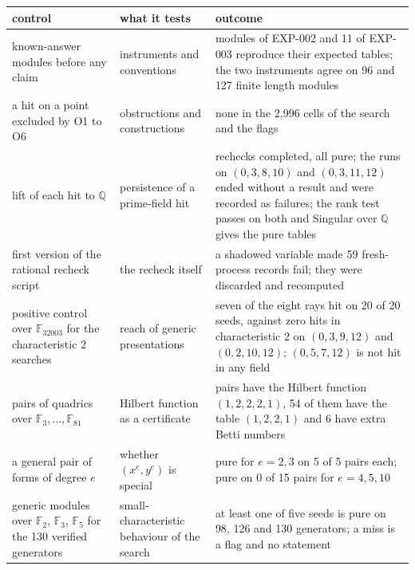 \begin{tabular}{@{}>{\raggedright\arraybackslash}p{4.3cm}>{\raggedright\arraybackslash}p{3.1cm}>{\raggedright\arraybackslash}p{6.1cm}@{}}
\toprule
control & what it tests & outcome\\
\midrule
known-answer modules before any claim & instruments and conventions & 17 modules of EXP-002 and 11 of EXP-003 reproduce their expected tables; the two instruments agree on 96 and 127 finite length modules\\
a hit on a point excluded by O1 to O6 & obstructions and constructions & none in the 2{,}996 cells of the search and the flags\\
lift of each hit to $\mathbb{Q}$ & persistence of a prime-field hit & 64 rechecks completed, all pure; the runs on $(0,3,8,10)$ and $(0,3,11,12)$ ended without a result and were recorded as failures; the rank test passes on both and Singular over $\mathbb{Q}$ gives the pure tables\\
first version of the rational recheck script & the recheck itself & a shadowed variable made 59 fresh-process records fail; they were discarded and recomputed\\
positive control over $\mathbb{F}_{32003}$ for the characteristic 2 searches & reach of generic presentations & seven of the eight rays hit on 20 of 20 seeds, against zero hits in characteristic 2 on $(0,3,9,12)$ and $(0,2,10,12)$; $(0,5,7,12)$ is not hit in any field\\
pairs of quadrics over $\mathbb{F}_3,\dots,\mathbb{F}_{81}$ & Hilbert function as a certificate & 60 pairs have the Hilbert function $(1,2,2,2,1)$, 54 of them have the table $(1,2,2,1)$ and 6 have extra Betti numbers\\
a general pair of forms of degree $e$ & whether $(x^e,y^e)$ is special & pure for $e=2,3$ on 5 of 5 pairs each; pure on 0 of 15 pairs for $e=4,5,10$\\
generic modules over $\mathbb{F}_2$, $\mathbb{F}_3$, $\mathbb{F}_5$ for the 130 verified generators & small-characteristic behaviour of the search & at least one of five seeds is pure on 98, 126 and 130 generators; a miss is a flag and no statement\\
\bottomrule
\end{tabular}
